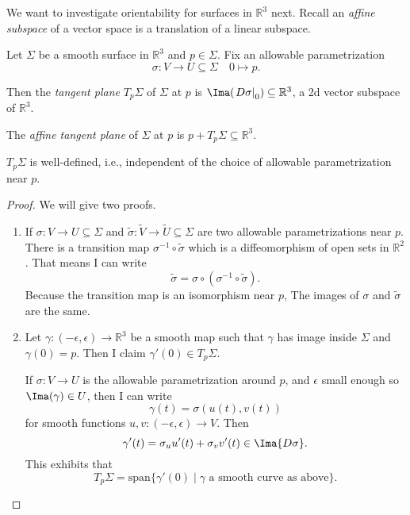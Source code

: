 We want to investigate orientability for surfaces in \(\mathbb{R}^3\) next. Recall an \textit{affine subspace} of a vector space is a translation of a linear subspace.
\begin{definition}
    Let \(\Sigma\) be a smooth surface in \(\mathbb{R}^3\) and \(p \in \Sigma\). Fix an allowable parametrization
    \[
        \sigma: V \to U \subseteq \Sigma \quad 0 \mapsto p.
    \]

    Then the \textit{tangent plane} \(T_p\Sigma\) of \(\Sigma\) at \(p\) is \(\Ima(\left.D\sigma\right|_0) \subseteq \mathbb{R}^3\), a 2d vector subspace of \(\mathbb{R}^3\).

    The \textit{affine tangent plane} of \(\Sigma\) at \(p\) is \(p + T_p\Sigma \subseteq \mathbb{R}^3\).
\end{definition}
\begin{lemma}
    \(T_p\Sigma\) is well-defined, i.e., independent of the choice of allowable parametrization near \(p\).
\end{lemma}
\begin{proof}
    We will give two proofs.
    \begin{enumerate}
        \item If \(\sigma: V \to U \subseteq \Sigma\) and \(\tilde{\sigma}: \tilde{V} \to \tilde{U} \subseteq \Sigma\) are two allowable parametrizations near \(p\). There is a transition map \(\sigma^{-1}\circ \tilde{\sigma}\) which is a diffeomorphism of open sets in \(\mathbb{R}^2\). That means I can write
        \[
            \tilde{\sigma} = \sigma\circ (\sigma^{-1}\circ \tilde{\sigma}).
        \]
        Because the transition map is an isomorphism near \(p\), The images of \(\sigma\) and \(\tilde{\sigma}\) are the same.
        \item Let \(\gamma: (-\epsilon, \epsilon) \to \mathbb{R}^3\) be a smooth map such that \(\gamma\) has image inside \(\Sigma\) and \(\gamma(0) = p\). Then I claim \(\gamma'(0) \in T_p\Sigma\).

        If \(\sigma: V \to U\) is the allowable parametrization around \(p\), and \(\epsilon\) small enough so \(\Ima(\gamma)\in U\), then I can write
        \[
            \gamma(t) = \sigma(u(t), v(t))
        \]
        for smooth functions \(u, v: (-\epsilon, \epsilon)\to V\). Then
        \[\gamma'(t)= \sigma_u u'(t) + \sigma_v v'(t) \in \Ima{D\sigma}.\]
        This exhibits that
        \[
            T_{p}\Sigma = \mathrm{span}\{\gamma'(0)\mid \gamma \text{ a smooth curve as above}\}.
        \]
    \end{enumerate}
\end{proof}
